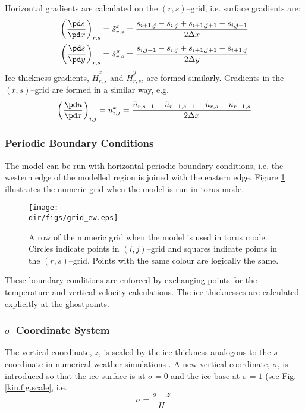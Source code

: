 Horizontal gradients are calculated on the $(r,s)$--grid, i.e. surface gradients are:
\begin{subequations}
\begin{align}
  \left(\frac{\pd s}{\pd x}\right)_{r,s}=\tilde{s}^x_{r,s}&=\frac{s_{i+1,j}-s_{i,j}+s_{i+1,j+1}-s_{i,j+1}}{2\Delta x}\\
  \left(\frac{\pd s}{\pd y}\right)_{r,s}=\tilde{s}^y_{r,s}&=\frac{s_{i,j+1}-s_{i,j}+s_{i+1,j+1}-s_{i+1,j}}{2\Delta y}
\end{align}  
\end{subequations}
Ice thickness gradients, $\tilde{H}^x_{r,s}$ and $\tilde{H}^y_{r,s}$, are formed similarly. Gradients in the $(r,s)$--grid are formed in a similar way, e.g. 
\begin{equation}
  \left(\frac{\pd u}{\pd x}\right)_{i,j}=u^x_{i,j}=\frac{\tilde{u}_{r,s-1}-\tilde{u}_{r-1,s-1}+\tilde{u}_{r,s}-\tilde{u}_{r-1,s}}{2\Delta x}
\end{equation}

\subsubsection{Periodic Boundary Conditions}
The model can be run with horizontal periodic boundary conditions, i.e. the western edge of the modelled region is joined with the eastern edge. Figure \ref{num.fig.grid_ew} illustrates the numeric grid when the model is run in torus mode.

\begin{figure}[htbp]
  \centering
  \texttt{[image: \\dir/figs/grid\_ew.eps]}
  \caption{A row of the numeric grid when the model is used in torus mode. Circles indicate points in $(i,j)$--grid and squares indicate points in the $(r,s)$--grid. Points with the same colour are logically the same.}
  \label{num.fig.grid_ew}
\end{figure}

These boundary conditions are enforced by exchanging points for the temperature and vertical velocity calculations. The ice thicknesses are calculated explicitly at the ghostpoints.

\subsubsection{$\sigma$--Coordinate System}
The vertical coordinate, $z$, is scaled by the ice thickness analogous to the $s$--coordinate in numerical weather simulations \citep[e.g.][]{Holton1992}. A new vertical coordinate, $\sigma$, is introduced so that the ice surface is at $\sigma=0$ and the ice base at $\sigma=1$ (see Fig. \ref{kin.fig.scale}, i.e.
\begin{equation}
  \label{kin.eq.vertical_scale}
  \sigma=\frac{s-z}{H}.
\end{equation}

